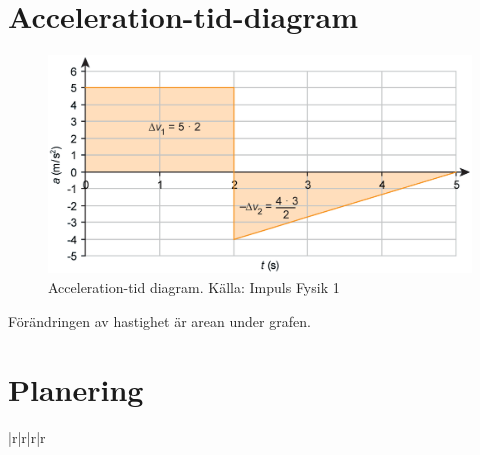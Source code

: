 \documentclass[11pt]{article}
\begin{document}
\section{Acceleration-tid-diagram}
\begin{figure}[!h]
\includegraphics[width=\textwidth]{../images/chapter3/accelerationTime.png}
\caption{Acceleration-tid diagram. Källa: Impuls Fysik 1}
\end{figure}
Förändringen av hastighet är arean under grafen.
\clearpage
\section{Planering}
\begin{table}{|r|r|r|r}
    
\end{table}
\end{document}
